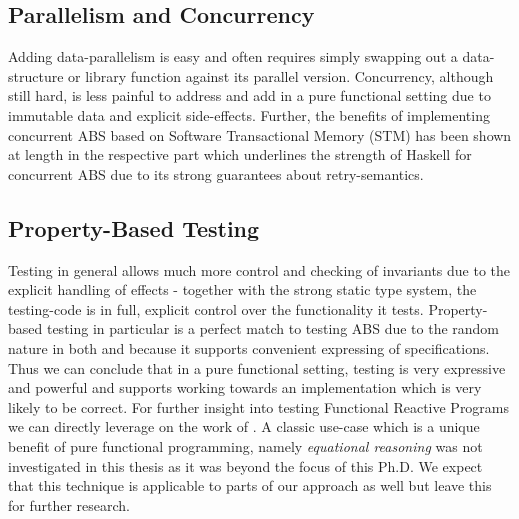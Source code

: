 \subsection{Parallelism and Concurrency}
Adding data-parallelism is easy and often requires simply swapping out a data-structure or library function against its parallel version. Concurrency, although still hard, is less painful to address and add in a pure functional setting due to immutable data and explicit side-effects. Further, the benefits of implementing concurrent ABS based on Software Transactional Memory (STM) has been shown at length in the respective part which underlines the strength of Haskell for concurrent ABS due to its strong guarantees about retry-semantics. 

\subsection{Property-Based Testing}
Testing in general allows much more control and checking of invariants due to the explicit handling of effects - together with the strong static type system, the testing-code is in full, explicit control over the functionality it tests. Property-based testing in particular is a perfect match to testing ABS due to the random nature in both and because it supports convenient expressing of specifications. Thus we can conclude that in a pure functional setting, testing is very expressive and powerful and supports working towards an implementation which is very likely to be correct. For further insight into testing Functional Reactive Programs we can directly leverage on the work of \cite{perez_testing_2017}. A classic use-case which is a unique benefit of pure functional programming, namely \textit{equational reasoning} was not investigated in this thesis as it was beyond the focus of this Ph.D. We expect that this technique is applicable to parts of our approach as well but leave this for further research.

